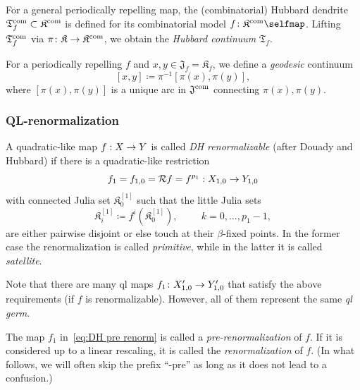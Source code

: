 \documentclass{amsart}
\newcommand{\filled}{{\mathfrak K }}
\newcommand{\Julia}{{\mathfrak J }}
\newcommand{\Hub}{{\mathfrak T}}
\newcommand{\1}{{\mathbb 1 }}
\begin{document}
For a general periodically repelling map,
the (combinatorial) Hubbard dendrite $\Hub_f^\com\subset \filled^\com$ is defined for its combinatorial model $f\colon \filled^\com \selfmap$.
Lifting $\Hub_f^\com$ via $\pi\colon \filled\to \filled^\com$, we obtain the {\em Hubbard continuum} $\Hub_f$.


For a periodically repelling $f$ and $x,y \in \Julia_f=\filled_f$, we define a \emph{geodesic} continuum 
\begin{equation}
\label{eq:geod contin}
[x,y]\coloneqq \pi^{-1}[\pi(x),\pi(y)],
\end{equation} 
where $[\pi(x),\pi(y)]$ is a unique arc in $\Julia^\com$ connecting $\pi(x),\pi(y)$.




\subsubsection{QL-renormalization}\label{renorm sec} 

A quadratic-like map  
$f: X \rightarrow Y$ is called {\it DH renormalizable} (after Douady and Hubbard) if there is a quadratic-like
restriction 
\begin{equation}
\label{eq:DH pre renorm}
        f_1=f_{1,0}= {\mathcal R} f= f^{p_1}: X_{1,0} \rightarrow Y_{1,0}
\end{equation}
 with connected Julia set $\filled_{0}^{[1]}$ such that
the little Julia sets 
\begin{equation}
\label{eq:small J cycle}
\filled^{[1]}_i\coloneqq f^i\left(\filled_{0}^{[1]}\right),  \hspace{1cm} k=0,\dots, p_1-1, 
\end{equation} are either pairwise disjoint or else touch at their $\beta$-fixed points. In the former case the renormalization is called {\it primitive}, while in the latter it is called {\it satellite}. 





Note that  there are many  ql maps $f_1\colon X_{1,0}' \rightarrow Y'_{1,0} $ that satisfy the above requirements
(if $f$ is renormalizable). However, all of them represent the same {\em ql germ}.



The map $f_1 $ in~\eqref{eq:DH pre renorm} is called a {\it pre-renormalization} of $f$.
If it is considered up to a linear rescaling, it is called  the {\it  renormalization} of $f$. (In what follows, we will often skip the prefix ``-pre'' as long as it does not lead to a confusion.)   
\end{document}
